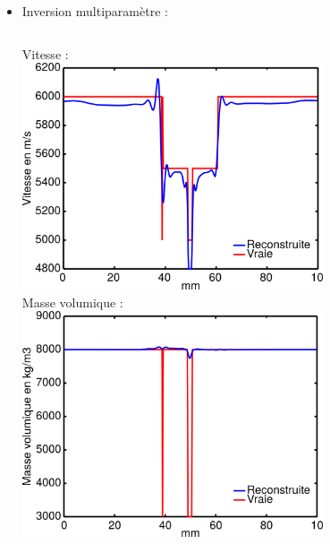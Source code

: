 \documentclass[10pt,xcolor=x11names,compress, notes=show]{beamer}%
\begin{document}
\begin{frame}
\begin{itemize}
\begin{columns}
	\end{columns}
	\item Inversion multiparamètre : \\[0.2cm]
	\begin{columns}
		\centering
		Vitesse : \\[0.2cm]
		\includegraphics[width=0.7\textwidth]{img/multi/coupe_vp_multi.png}\\
		\centering
		Masse volumique : \\[0.2cm]
		\includegraphics[width=0.7\textwidth]{img/multi/coupe_rho_multi.png}\\
	\end{columns}
	
\end{itemize}
\end{frame}
\end{document}
